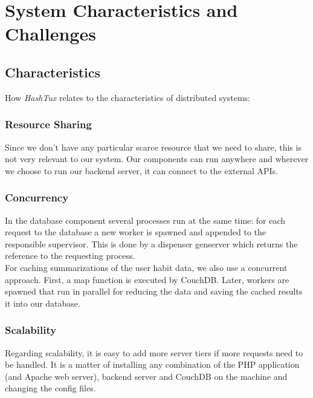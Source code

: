 \label{systemcharacteristics}
\chapter[System Characteristics and Challenges]
   {System Characteristics and\\ Challenges}

\section{Characteristics}
How \textit{HashTux} relates to the characteristics of distributed systems:

\subsection{Resource Sharing}
Since we don’t have any particular scarce resource that we need to share, this
is not very relevant to our system. Our components can run anywhere and wherever
we choose to run our backend server, it can connect to the external APIs.

\subsection{Concurrency}
In the database component several processes run at the same time: for each
request to the database a new worker is spawned and appended to the responsible
supervisor. This is done by a dispenser gen\textunderscore server which returns
the reference to the requesting process. \\

For caching summarizations of the user habit data, we also use a concurrent
approach. First, a map function is executed by CouchDB. Later, workers are
spawned that run in parallel for reducing the data and saving the cached results
it into our database.

\subsection{Scalability}
Regarding scalability, it is easy to add more server tiers if more requests need
to be handled. It is a matter of installing any combination of the PHP
application (and Apache web server), backend server and CouchDB on the machine
and changing the config files. \\

